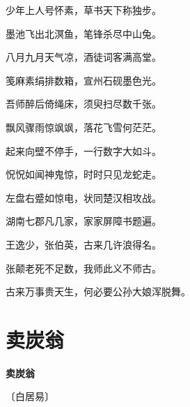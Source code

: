 \documentclass[12pt,UTF-8,openany,fontset=none]{ctexbook}
\begin{document}
\begin{center}
    \begin{Large}

        少年上人号怀素，草书天下称独步。

        墨池飞出北溟鱼，笔锋杀尽中山兔。

        八月九月天气凉，酒徒词客满高堂。

        笺麻素绢排数箱，宣州石砚墨色光。

        吾师醉后倚绳床，须臾扫尽数千张。

        飘风骤雨惊飒飒，落花飞雪何茫茫。

        起来向壁不停手，一行数字大如斗。

        怳怳如闻神鬼惊，时时只见龙蛇走。

        左盘右蹙如惊电，状同楚汉相攻战。

        湖南七郡凡几家，家家屏障书题遍。

        王逸少，张伯英，古来几许浪得名。

        张颠老死不足数，我师此义不师古。

        \hspace{52pt}古来万事贵天生，何必要公孙大娘浑脱舞。

    \end{Large}

\end{center}

\vspace{8pt}
\clearpage

\section{卖炭翁}


\begin{center}
    {\bfseries 卖炭翁}

    \vspace{18pt}

    \begin{large}\xuwen
        〔白居易〕
    \end{large}

\end{center}

    \vspace{18pt}  %
\end{document}
